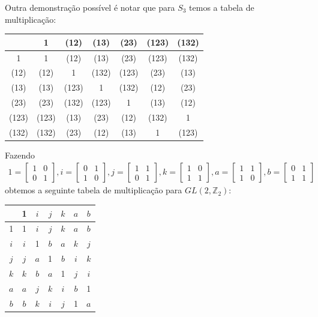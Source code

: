 \documentclass[a4paper,portuguese,11pt,twoside, leqno]{book}
\theoremstyle{definition}
\begin{document}
	\par\vspace{0.3cm} Outra demonstração possível é notar que para $S_3$ temos a tabela de multiplicação:
	\begin{table}[H]
		\centering
		\noindent\begin{tabular}{c|cccccc}
			& 1 & (12) & (13) & (23) & (123) & (132) \\
			\hline
			1 & 1 & (12) & (13) & (23) & (123) & (132) \\
			(12) & (12) & 1 & (132) & (123) & (23) & (13) \\
			(13) & (13) & (123) & 1 & (132) & (12) & (23) \\
			(23) & (23) & (132) & (123) & 1 & (13) & (12) \\
			(123) & (123) & (13) & (23) & (12) & (132) & 1 \\
			(132) & (132) & (23) & (12) & (13) & 1 & (123) \\
		\end{tabular}
	\end{table}
	\par \vspace{0.3cm} Fazendo 
	\begin{align*}
	1 = \begin{bmatrix}
	1 & 0 \\
	0 & 1
	\end{bmatrix}, 
	i = \begin{bmatrix}
	0 & 1 \\
	1 & 0
	\end{bmatrix}, 
	j = \begin{bmatrix}
	1 & 1 \\
	0 & 1
	\end{bmatrix}, 
	k = \begin{bmatrix}
	1 & 0 \\
	1 & 1
	\end{bmatrix},
	a = \begin{bmatrix}
	1 & 1 \\
	1 & 0
	\end{bmatrix}, 
	b = \begin{bmatrix}
	0 & 1 \\
	1 & 1
	\end{bmatrix}
	\end{align*} 
	obtemos a seguinte tabela de multiplicação para $GL(2, \mathbb{Z}_2)$:
	\begin{table}[H]
		\centering
		\noindent\begin{tabular}{c|cccccc}
			& 1 & $i$ & $j$ & $k$ & $a$ & $b$ \\
			\hline
			1 & 1 & $i$ & $j$ & $k$ & $a$ & $b$ \\
			$i$ & $i$ & 1 & $b$ & $a$ & $k$ & $j$ \\
			$j$ & $j$ & $a$ & 1 & $b$ & $i$ & $k$ \\
			$k$ & $k$ & $b$ & $a$ & 1 & $j$ & $i$ \\
			$a$ & $a$ & $j$ & $k$ & $i$ & $b$ & 1 \\
			$b$ & $b$ & $k$ & $i$ & $j$ & 1 & $a$ \\
		\end{tabular}
	\end{table}
\end{document}
